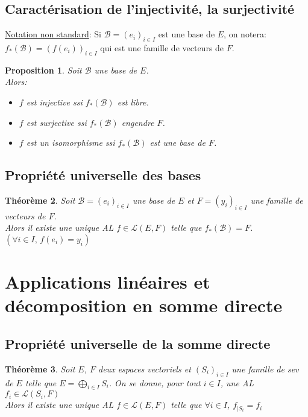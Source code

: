 \documentclass[10pt,a4paper]{article}
\theoremstyle{plain}
\newtheorem{proposition}{Proposition}[section]
\newtheorem{theorem}[proposition]{Théorème}
\theoremstyle{definition}
\begin{document}
\subsection{Caractérisation de l'injectivité, la surjectivité}
\noindent \uline{Notation non standard}: Si $\mathcal{B} = (e_i)_{i \in I}$ est une base de $E$, on notera: \\
$f_*(\mathcal{B}) = (f(e_i))_{i \in I}$ qui est une famille de vecteurs de $F$.
\begin{proposition}
Soit $\mathcal{B}$ une base de $E$. \\
Alors:
\begin{itemize}
\item $f$ est injective ssi $f_*(\mathcal{B})$ est libre.
\item $f$ est surjective ssi $f_*(\mathcal{B})$ engendre $F$.
\item $f$ est un isomorphisme ssi $f_*(\mathcal{B})$ est une base de $F$.
\end{itemize}
\end{proposition}

\subsection{Propriété universelle des bases}
\begin{theorem}
Soit $\mathcal{B} = (e_i)_{i \in I}$ une base de $E$ et $F = (y_i)_{i \in I}$ une famille de vecteurs de $F$. \\
Alors il existe une unique AL $f \in \mathcal{L}(E, F)$ telle que $f_*(\mathcal{B}) = F$. $(\forall i \in I,\, f(e_i) = y_i)$
\end{theorem}

\section{Applications linéaires et décomposition en somme directe}
\subsection{Propriété universelle de la somme directe}
\begin{theorem}
Soit $E$, $F$ deux espaces vectoriels et $(S_i)_{i \in I}$ une famille de sev de $E$ telle que $E = \bigoplus\limits_{i \in I} S_i$. On se donne, pour tout $i \in I$, une AL $f_i \in \mathcal{L}(S_i, F)$ \\
Alors il existe une unique AL $f \in \mathcal{L}(E, F)$ telle que $\forall i \in I$, $f_{|S_i} = f_i$
\end{theorem}
\end{document}
